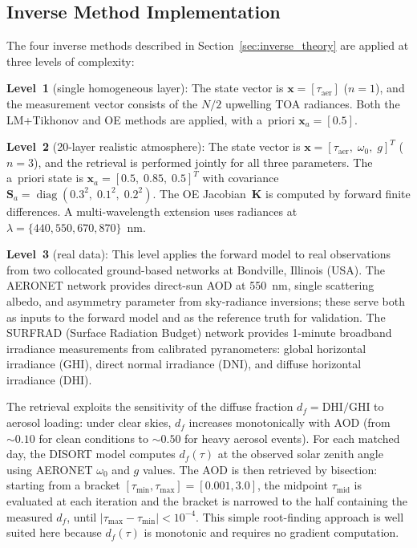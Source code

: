 \documentclass[a4paper, 11pt]{article}
\begin{document}
\subsection{Inverse Method Implementation}
\label{sec:inverse_impl}

The four inverse methods described in Section~\ref{sec:inverse_theory}
are applied at three levels of complexity:

\textbf{Level~1} (single homogeneous layer): The state vector is
$\mathbf{x} = [\tau_{\text{aer}}]$ ($n=1$), and the measurement
vector consists of the $N/2$ upwelling TOA radiances.  Both the
LM+Tikhonov and OE methods are applied, with a~priori
$\mathbf{x}_a = [0.5]$.

\textbf{Level~2} (20-layer realistic atmosphere): The state vector is
$\mathbf{x} = [\tau_{\text{aer}},\;\omega_0,\;g]^T$ ($n=3$), and
the retrieval is performed jointly for all three parameters.  The
a~priori state is $\mathbf{x}_a = [0.5,\;0.85,\;0.5]^T$ with
covariance
$\mathbf{S}_a = \operatorname{diag}(0.3^2,\;0.1^2,\;0.2^2)$.  The
OE Jacobian~$\mathbf{K}$ is computed by forward finite differences.  A multi-wavelength
extension uses radiances at $\lambda = \{440, 550, 670, 870\}$~nm.

\textbf{Level~3} (real data): This level applies the forward model to
real observations from two collocated ground-based networks at
Bondville, Illinois (USA).  The AERONET network \cite{holben1998}
provides direct-sun AOD at 550~nm, single scattering albedo, and
asymmetry parameter from sky-radiance inversions; these serve both as
inputs to the forward model and as the reference truth for validation.
The SURFRAD (Surface Radiation Budget) network provides 1-minute
broadband irradiance measurements from calibrated pyranometers: global
horizontal irradiance (GHI), direct normal irradiance (DNI), and
diffuse horizontal irradiance (DHI).

The retrieval exploits the sensitivity of the diffuse fraction
$d_f = \mathrm{DHI}/\mathrm{GHI}$ to aerosol loading: under clear
skies, $d_f$ increases monotonically with AOD (from ${\sim}0.10$ for
clean conditions to ${\sim}0.50$ for heavy aerosol events).  For each
matched day, the DISORT model computes $d_f(\tau)$ at the observed
solar zenith angle using AERONET $\omega_0$ and $g$ values.  The AOD
is then retrieved by bisection: starting from a bracket
$[\tau_{\min}, \tau_{\max}] = [0.001, 3.0]$, the midpoint
$\tau_{\text{mid}}$ is evaluated at each iteration and the bracket is
narrowed to the half containing the measured $d_f$, until
$|\tau_{\max} - \tau_{\min}| < 10^{-4}$.  This simple root-finding
approach is well suited here because $d_f(\tau)$ is monotonic and
requires no gradient computation.
\end{document}
